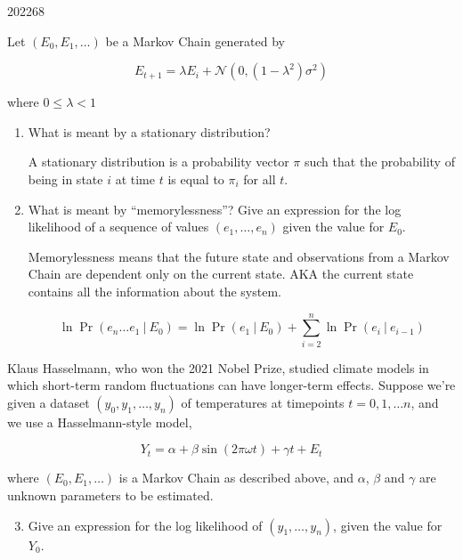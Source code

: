 \documentclass[10pt,\jkfside,a4paper]{article}
\begin{document}
\begin{examquestion}{2022}{6}{8}

Let $(E_0, E_1, \dots)$ be a Markov Chain generated by

\[
E_{t+1} = \lambda E_i + \mathcal{N}(0, (1 - \lambda^2)\sigma^2)
\]

where $0 \leq \lambda < 1$

\begin{enumerate}[label=(\alph*)]

\item What is meant by a stationary distribution?

A stationary distribution is a probability vector $\pi$ such that the
probability of being in state $i$ at time $t$ is equal to $\pi_i$ for all $t$.

\item What is meant by ``memorylessness''? Give an expression for the log
likelihood of a sequence of values $(e_1, \dots, e_n)$ given the value for
$E_0$.

Memorylessness means that the future state and observations from a Markov
Chain are dependent only on the current state. AKA the current state
contains all the information about the system.

\[
\ln\Pr(e_n\dots e_1 \ | \ E_0) = \ln\Pr(e_1 \ | \ E_0) + \sum^{n}_{i=2}\ln\Pr
(e_{i} \ | \ e_{i-1})
\]

\end{enumerate}

Klaus Hasselmann, who won the 2021 Nobel Prize, studied climate models in
which short-term random fluctuations can have longer-term effects. Suppose
we're given a dataset $(y_0, y_1, \dots, y_n)$ of temperatures at timepoints
$t = 0, 1, \dots n$, and we use a Hasselmann-style model,

\[
Y_t = \alpha + \beta \sin(2\pi \omega t) + \gamma t + E_t
\]

where $(E_0, E_1, \dots)$ is a Markov Chain as described above, and
$\alpha$, $\beta$ and $\gamma$ are unknown parameters to be estimated.

\begin{enumerate}[label=(\alph*)]

\setcounter{enumi}{2}

\item Give an expression for the log likelihood of $(y_1, \dots, y_n)$, given
the value for $Y_0$.


\end{enumerate}
\end{examquestion}
\end{document}
